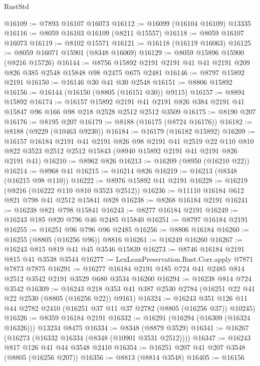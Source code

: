 \begin{lexlean}{RustStd}
\begin{coremodule}
@16109 := @7893 @16107 @16073
@16112 := @16099 (@16104 @16109) @13335
@16116 := @8059 @16103 @16109 (@8211 @15557)
@16118 := @8059 @16107 @16073
@16119 := @8102 @15571
@16121 := @16118 (@16119 @16063)
@16125 := @8059 @16071 @15901 (@8348 @16069)
@16129 := @8059 @15896 @15900 (@8216 @15726)
@16144 := @8756 @15892 @2191 @2191 @41 @41 @2191 @209 @826 @385 @2548 @15848 @98 @2475 @675 @2481
@16146 := @8797 @15892 @2191
@16150 := @16146 @30 @41 @30 @2548
@16151 := @8806 @15892
@16156 := @16144 (@16150 (@8805 (@16151 @30)) @9115)
@16157 := @8894 @15892
@16174 := @16157
    @15892
    @2191
    @41
    @2191
    @826
    @384
    @2191
    @41
    @15847
    @96
    @166
    @98
    @218
    @2528
    @2512
    @2512
    @3509
@16175 := @8190 @207
@16176 := @8195 @207
@16179 := @8188 (@16175 (@8724 @16176))
@16182 := @8188 (@9229 (@10463 @9230))
@16184 := @16179 (@16182 @15892)
@16209 := @16157
    @16184
    @2191
    @41
    @2191
    @826
    @98
    @2191
    @41
    @2519
    @22
    @110
    @810
    @822
    @3523
    @2512
    @2512
    @15843
    (@8940 @15892 @2191 @41 @2191 @826 @2191 @41)
@16210 := @8962 @826
@16213 := @16209 (@8950 (@16210 @22))
@16214 := @8968 @41
@16215 := @16214 @826
@16219 := @16213 (@8348 (@16215 @98 @110))
@16222 := @8976 @15892 @41 @2191
@16228 := @16219 (@8216 (@16222 @110 @810 @3523 @2512))
@16236 := @11110 @16184 @612 @821 @798 @41 @2512 @15841 @828
@16238 := @8268 @16184 @2191
@16241 := @16238 @821 @798 @15841
@16243 := @8277 @16184 @2191
@16249 := @16243 @185 @820 @796 @46 @2485 @15840
@16251 := @8797 @16184 @2191
@16255 := @16251 @96 @796 @96 @2485
@16256 := @8806 @16184
@16260 := @16255 (@8805 (@16256 @96)) @8816
@16261 := @16249 @16260
@16267 := @16243 @815 @819 @41 @45 @3546 @15839
@16273 := @8746 @16184 @2191 @815 @41 @3538 @3544
@16277 := LexLeanPreservation.Rust.Corr.apply @7871 @7873 @7875
@16291 := @16277 @16184 @2191 @185 @724 @41 @2485 @814 @2512 @3542 @2191 @3529 @680 @3534 @16260
@16294 := @16238 @814 @724 @3542
@16309 := @16243
    @218
    @353
    @41
    @387
    @2530
    @2784
    (@16251 @22 @41 @22 @2530 (@8805 (@16256 @22)) @9161)
@16324 := @16243
    @351
    @126
    @11
    @44
    @2782
    @2410
    (@16251 @37 @11 @37 @2782 (@8805 (@16256 @37)) @10245)
@16326 := @8359 @16184 @2191
@16332 := @16291 (@16294 (@16309 (@16324 @16326))) @13234 @8475
@16334 := @8348 (@8879 @3529)
@16341 := @16267 (@16273 (@16332 @16334 (@8348 (@10901 @3531 @2512))))
@16347 := @16243 @817 @126 @41 @44 @3548 @2410
@16354 := @16251 @207 @41 @207 @3548 (@8805 (@16256 @207))
@16356 := @8813 (@8814 @3548)
@16405 := @16156

\end{coremodule}
\end{lexlean}
